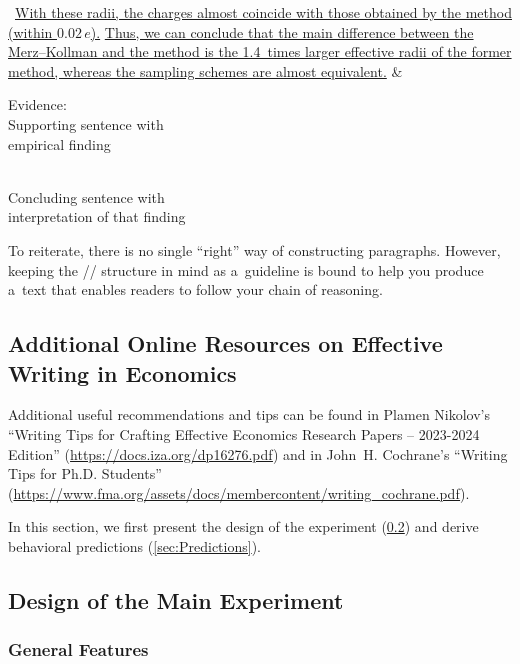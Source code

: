 \begingroup
	\begin{longtblr}{}
		\textellipsis\ {\ul{With these radii, the charges almost coincide with those obtained by the \mbox{} method (within ${0.02\,e}$).}}
		{\ul{Thus, we can conclude that the main difference between the Merz--Kollman and the \mbox{} method is the 1.4~times larger effective radii of the former method, whereas the sampling schemes are almost equivalent.}}
		&
		{%
			\textcolor{DeepPink4}{Evidence: \\ Supporting sentence with \\ empirical finding} \\ \strut \\
			\textcolor{DarkOrchid3}{Concluding sentence with \\ interpretation of that finding}%
		}
	\end{longtblr}
\endgroup

To reiterate, there is no single ``right'' way of constructing paragraphs. However, keeping the // structure in mind as a~guideline is bound to help you produce a~text that enables readers to follow your chain of reasoning.

\endgroup

\subsection{Additional Online Resources on Effective Writing in Economics}

Additional useful recommendations and tips can be found in Plamen Nikolov's ``Writing Tips for Crafting Effective Economics Research Papers -- 2023-2024 Edition'' (\url{https://docs.iza.org/dp16276.pdf}) and in John~H. Cochrane's ``Writing Tips for Ph.D. Students'' (\url{https://www.fma.org/assets/docs/membercontent/writing_cochrane.pdf}).

In this section, we first present the design of the experiment (\ref{sec:design}) and derive behavioral predictions (\ref{sec:Predictions}).

\subsection{Design of the Main Experiment}
\label{sec:design}

\subsubsection{General Features}
\blindtext

